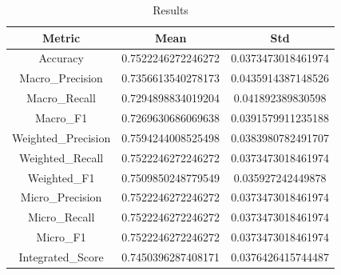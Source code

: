 \begin{table}[htbp]
\centering
\caption{Results}
\label{tab:csv}
\small
\setlength{\tabcolsep}{4pt}
\begin{tabular}{|c|c|c|}
\hline
Metric & Mean & Std \\
\hline
Accuracy & 0.7522246272246272 & 0.0373473018461974 \\
Macro_Precision & 0.7356613540278173 & 0.0435914387148526 \\
Macro_Recall & 0.7294898834019204 & 0.041892389830598 \\
Macro_F1 & 0.7269630686069638 & 0.0391579911235188 \\
Weighted_Precision & 0.7594244008525498 & 0.0383980782491707 \\
Weighted_Recall & 0.7522246272246272 & 0.0373473018461974 \\
Weighted_F1 & 0.7509850248779549 & 0.035927242449878 \\
Micro_Precision & 0.7522246272246272 & 0.0373473018461974 \\
Micro_Recall & 0.7522246272246272 & 0.0373473018461974 \\
Micro_F1 & 0.7522246272246272 & 0.0373473018461974 \\
Integrated_Score & 0.7450396287408171 & 0.0376426415744487 \\
\hline
\end{tabular}
\end{table}